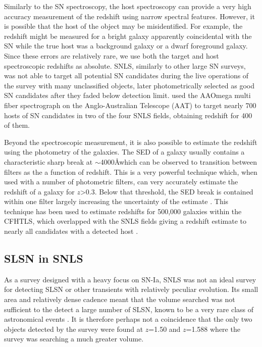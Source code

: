 Similarly to the SN spectroscopy, the host spectroscopy can provide a very high accuracy measurement of the redshift using narrow spectral features. However, it is possible that the host of the object may be misidentified. For example, the redshift might be measured for a bright galaxy apparently coincidental with the SN while the true host was a background galaxy or a dwarf foreground galaxy. Since these errors are relatively rare, we use both the target and host spectroscopic redshifts as absolute. SNLS, similarly to other large SN surveys, was not able to target all potential SN candidates during the live operations of the survey with many unclassified objects, later photometrically selected as good SN candidates after they faded below detection limit. \citet{Lidman2012} used the AAOmega multi fiber spectrograph on the Anglo-Australian Telescope (AAT) to target nearly 700 hosts of SN candidates in two of the four SNLS fields, obtaining redshift for 400 of them.
% 
% 

Beyond the spectroscopic measurement, it is also possible to estimate the redshift using the photometry of the galaxies. The SED of a galaxy usually contains a characteristic sharp break at $\sim$4000\AA which can be observed to transition between filters as the a function of redshift. This is a very powerful technique which, when used with a number of photometric filters, can very accurately estimate the redshift of a galaxy for $z$>0.3. Below that threshold, the SED break is contained within one filter largely increasing the uncertainty of the estimate \citep{Connolly1995}. This technique has been used to estimate redshifts for 500,000 galaxies within the CFHTLS, which overlapped with the SNLS fields giving a redshift estimate to nearly all candidates with a detected host \citep{Ilbert2006}.
% 
% 

\subsection{SLSN in SNLS}
As a survey designed with a heavy focus on SN-Ia, SNLS was not an ideal survey for detecting SLSN or other transients with relatively peculiar evolution. Its small area and relatively dense cadence meant that the volume searched was not sufficient to the detect a large number of SLSN, known to be a very rare class of astronomical events \citep{Cooke2012,Prajs2016,Quimby2013}. It is therefore perhaps not a coincidence that the only two objects detected by the survey were found at $z$=1.50 and $z$=1.588 where the survey was searching a much greater volume.

